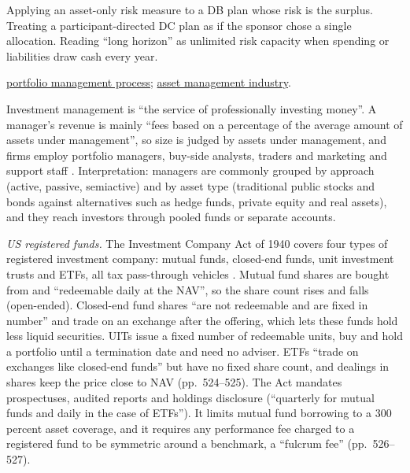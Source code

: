 \begin{qfdefinition}
 Applying an asset-only risk measure to a DB plan whose risk is the surplus. Treating a participant-directed DC plan as if the sponsor chose a single allocation. Reading ``long horizon'' as unlimited risk capacity when spending or liabilities draw cash every year.

 \hyperref[def:portfolio-management-process]{portfolio management process}; \hyperref[def:asset-management-industry]{asset management industry}.

\end{qfdefinition}

\begin{qfdefinition}\label{def:asset-management-industry}
 Investment management is ``the service of professionally investing money''. A manager's revenue is mainly ``fees based on a percentage of the average amount of assets under management'', so size is judged by assets under management, and firms employ portfolio managers, buy-side analysts, traders and marketing and support staff \citep[chap.~1, pp.~2--4]{managing-investment-portfolios-2007}. Interpretation: managers are commonly grouped by approach (active, passive, semiactive) and by asset type (traditional public stocks and bonds against alternatives such as hedge funds, private equity and real assets), and they reach investors through pooled funds or separate accounts.

\emph{US registered funds.} The Investment Company Act of 1940 covers four types of registered investment company: mutual funds, closed-end funds, unit investment trusts and ETFs, all tax pass-through vehicles \citep[chap.~16, p.~523]{s7-ang}. Mutual fund shares are bought from and ``redeemable daily at the NAV'', so the share count rises and falls (open-ended). Closed-end fund shares ``are not redeemable and are fixed in number'' and trade on an exchange after the offering, which lets these funds hold less liquid securities. UITs issue a fixed number of redeemable units, buy and hold a portfolio until a termination date and need no adviser. ETFs ``trade on exchanges like closed-end funds'' but have no fixed share count, and dealings in shares keep the price close to NAV (pp.~524--525). The Act mandates prospectuses, audited reports and holdings disclosure (``quarterly for mutual funds and daily in the case of ETFs''). It limits mutual fund borrowing to a 300 percent asset coverage, and it requires any performance fee charged to a registered fund to be symmetric around a benchmark, a ``fulcrum fee'' (pp.~526--527).


\end{qfdefinition}
